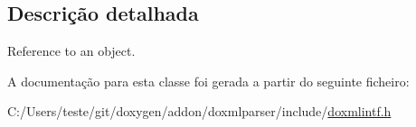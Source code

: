 \subsection{Descrição detalhada}
Reference to an object. 

A documentação para esta classe foi gerada a partir do seguinte ficheiro\-:\begin{DoxyCompactItemize}
\item 
C\-:/\-Users/teste/git/doxygen/addon/doxmlparser/include/\hyperlink{include_2doxmlintf_8h}{doxmlintf.\-h}\end{DoxyCompactItemize}
